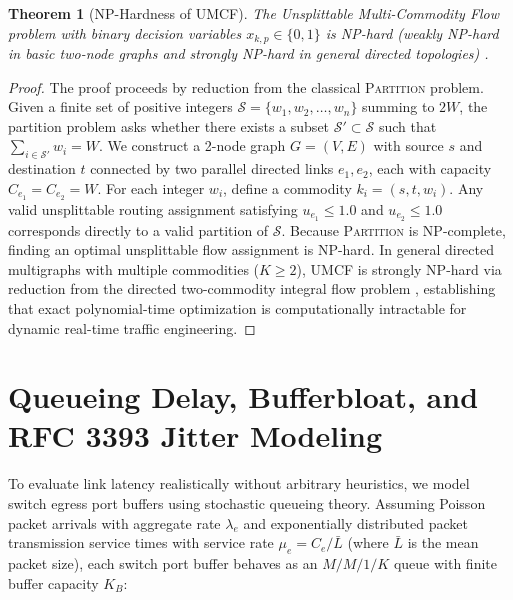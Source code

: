 \documentclass[12pt,a4paper,oneside]{report}
\newtheorem{theorem}{Theorem}[chapter]
\begin{document}
\begin{theorem}[NP-Hardness of UMCF]
The Unsplittable Multi-Commodity Flow problem with binary decision variables $x_{k, p} \in \{0, 1\}$ is NP-hard (weakly NP-hard in basic two-node graphs and strongly NP-hard in general directed topologies) \cite{garey1979computers, even1976complexity}.
\end{theorem}
\begin{proof}
The proof proceeds by reduction from the classical \textsc{Partition} problem. Given a finite set of positive integers $\mathcal{S} = \{w_1, w_2, \dots, w_n\}$ summing to $2W$, the partition problem asks whether there exists a subset $\mathcal{S}' \subset \mathcal{S}$ such that $\sum_{i \in \mathcal{S}'} w_i = W$. We construct a 2-node graph $G=(V, E)$ with source $s$ and destination $t$ connected by two parallel directed links $e_1, e_2$, each with capacity $C_{e_1} = C_{e_2} = W$. For each integer $w_i$, define a commodity $k_i = (s, t, w_i)$. Any valid unsplittable routing assignment satisfying $u_{e_1} \le 1.0$ and $u_{e_2} \le 1.0$ corresponds directly to a valid partition of $\mathcal{S}$. Because \textsc{Partition} is NP-complete, finding an optimal unsplittable flow assignment is NP-hard. In general directed multigraphs with multiple commodities ($K \ge 2$), UMCF is strongly NP-hard via reduction from the directed two-commodity integral flow problem \cite{even1976complexity}, establishing that exact polynomial-time optimization is computationally intractable for dynamic real-time traffic engineering.
\end{proof}

\section{Queueing Delay, Bufferbloat, and RFC 3393 Jitter Modeling}
To evaluate link latency realistically without arbitrary heuristics, we model switch egress port buffers using stochastic queueing theory. Assuming Poisson packet arrivals with aggregate rate $\lambda_e$ and exponentially distributed packet transmission service times with service rate $\mu_e = C_e / \bar{L}$ (where $\bar{L}$ is the mean packet size), each switch port buffer behaves as an $M/M/1/K$ queue with finite buffer capacity $K_B$:
\end{document}
